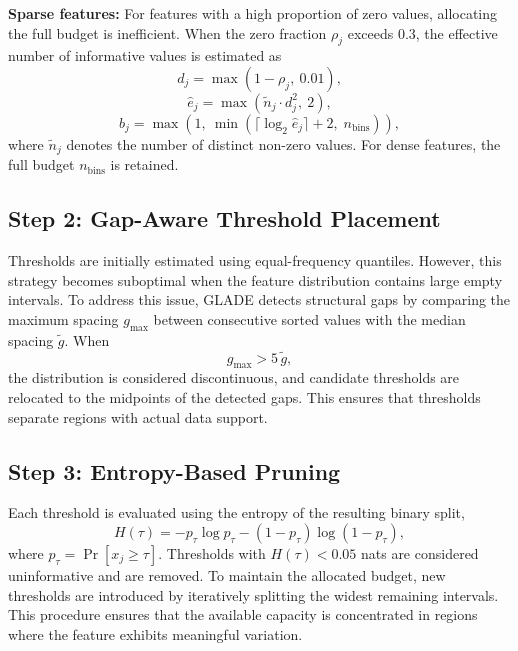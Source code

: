 \documentclass[journal,twoside,web]{ieeecolor}
\begin{document}
\textbf{Sparse features:} For features with a high proportion of
zero values, allocating the full budget is inefficient. When the
zero fraction $\rho_j$ exceeds 0.3, the effective number of
informative values is estimated as
\begin{equation}
  d_j = \max(1 - \rho_j,\ 0.01),
\end{equation}
\begin{equation}
  \hat{e}_j = \max\!\left(\tilde{n}_j \cdot d_j^{2},\ 2\right),
\end{equation}
\begin{equation}
  b_j = \max\!\left(1,\ \min\!\left(
        \lceil \log_2 \hat{e}_j \rceil + 2,\;
        n_\text{bins}\right)\right),
\end{equation}
where $\tilde{n}_j$ denotes the number of distinct non-zero values.
For dense features, the full budget $n_\text{bins}$ is retained.

\subsection{Step 2: Gap-Aware Threshold Placement}
\label{subsec:gaps}

Thresholds are initially estimated using equal-frequency quantiles.
However, this strategy becomes suboptimal when the feature
distribution contains large empty intervals. To address this issue,
GLADE detects structural gaps by comparing the maximum spacing
$g_\text{max}$ between consecutive sorted values with the median
spacing $\tilde{g}$. When
\begin{equation}
  g_\text{max} > 5\,\tilde{g},
\end{equation}
the distribution is considered discontinuous, and candidate
thresholds are relocated to the midpoints of the detected gaps.
This ensures that thresholds separate regions with actual data
support.

\subsection{Step 3: Entropy-Based Pruning}
\label{subsec:entropy}

Each threshold is evaluated using the entropy of the resulting
binary split,
\begin{equation}
  H(\tau) = -p_\tau \log p_\tau - (1-p_\tau)\log(1-p_\tau),
\end{equation}
where $p_\tau = \Pr[x_j \geq \tau]$. Thresholds with
$H(\tau) < 0.05$ nats are considered uninformative and are removed.
To maintain the allocated budget, new thresholds are introduced by
iteratively splitting the widest remaining intervals. This procedure
ensures that the available capacity is concentrated in regions where
the feature exhibits meaningful variation.
\end{document}
